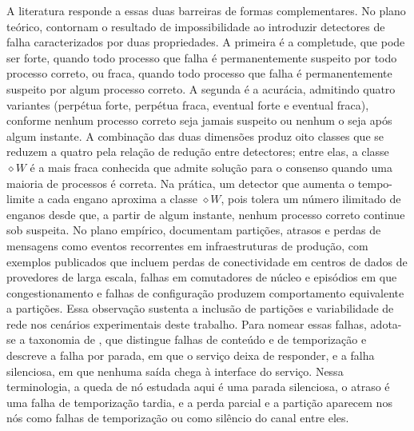 A literatura responde a essas duas barreiras de formas complementares. No plano teórico, \citet{chandra_toueg_failure_detectors_1996} contornam o resultado de impossibilidade ao introduzir detectores de falha caracterizados por duas propriedades. A primeira é a completude, que pode ser forte, quando todo processo que falha é permanentemente suspeito por todo processo correto, ou fraca, quando todo processo que falha é permanentemente suspeito por algum processo correto. A segunda é a acurácia, admitindo quatro variantes (perpétua forte, perpétua fraca, eventual forte e eventual fraca), conforme nenhum processo correto seja jamais suspeito ou nenhum o seja após algum instante. A combinação das duas dimensões produz oito classes que se reduzem a quatro pela relação de redução entre detectores; entre elas, a classe $\diamond W$ é a mais fraca conhecida que admite solução para o consenso quando uma maioria de processos é correta. Na prática, um detector que aumenta o tempo-limite a cada engano aproxima a classe $\diamond W$, pois tolera um número ilimitado de enganos desde que, a partir de algum instante, nenhum processo correto continue sob suspeita. No plano empírico, \citet{bailis_kingsbury_network_2014} documentam partições, atrasos e perdas de mensagens como eventos recorrentes em infraestruturas de produção, com exemplos publicados que incluem perdas de conectividade em centros de dados de provedores de larga escala, falhas em comutadores de núcleo e episódios em que congestionamento e falhas de configuração produzem comportamento equivalente a partições. Essa observação sustenta a inclusão de partições e variabilidade de rede nos cenários experimentais deste trabalho. Para nomear essas falhas, adota-se a taxonomia de \citet{avizienis_taxonomy_2004}, que distingue falhas de conteúdo e de temporização e descreve a falha por parada, em que o serviço deixa de responder, e a falha silenciosa, em que nenhuma saída chega à interface do serviço. Nessa terminologia, a queda de nó estudada aqui é uma parada silenciosa, o atraso é uma falha de temporização tardia, e a perda parcial e a partição aparecem nos nós como falhas de temporização ou como silêncio do canal entre eles.

